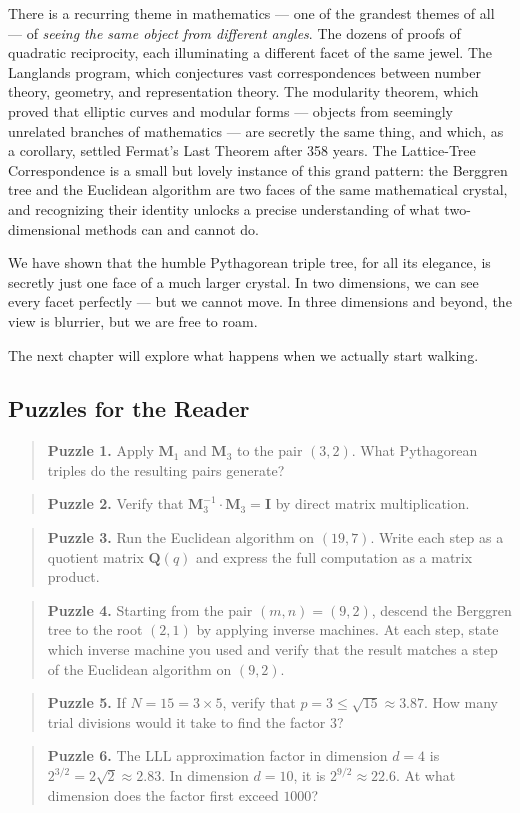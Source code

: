 \documentclass[11pt,twoside,openright]{book}
\theoremstyle{definition}
\theoremstyle{remark}
\begin{document}
There is a recurring theme in mathematics --- one of the grandest themes of all --- of \textit{seeing the same object from different angles}. The dozens of proofs of quadratic reciprocity, each illuminating a different facet of the same jewel. The Langlands program, which conjectures vast correspondences between number theory, geometry, and representation theory. The modularity theorem, which proved that elliptic curves and modular forms --- objects from seemingly unrelated branches of mathematics --- are secretly the same thing, and which, as a corollary, settled Fermat's Last Theorem after 358 years. The Lattice-Tree Correspondence is a small but lovely instance of this grand pattern: the Berggren tree and the Euclidean algorithm are two faces of the same mathematical crystal, and recognizing their identity unlocks a precise understanding of what two-dimensional methods can and cannot do.

We have shown that the humble Pythagorean triple tree, for all its elegance, is secretly just one face of a much larger crystal. In two dimensions, we can see every facet perfectly --- but we cannot move. In three dimensions and beyond, the view is blurrier, but we are free to roam.

The next chapter will explore what happens when we actually start walking.


\subsection{Puzzles for the Reader}

\begin{quote}
\textbf{Puzzle 1.} Apply $\mathbf{M}_1$ and $\mathbf{M}_3$ to the pair $(3, 2)$. What Pythagorean triples do the resulting pairs generate?
\end{quote}
\begin{quote}
\textbf{Puzzle 2.} Verify that $\mathbf{M}_3^{-1} \cdot \mathbf{M}_3 = \mathbf{I}$ by direct matrix multiplication.
\end{quote}
\begin{quote}
\textbf{Puzzle 3.} Run the Euclidean algorithm on $(19, 7)$. Write each step as a quotient matrix $\mathbf{Q}(q)$ and express the full computation as a matrix product.
\end{quote}
\begin{quote}
\textbf{Puzzle 4.} Starting from the pair $(m, n) = (9, 2)$, descend the Berggren tree to the root $(2, 1)$ by applying inverse machines. At each step, state which inverse machine you used and verify that the result matches a step of the Euclidean algorithm on $(9, 2)$.
\end{quote}
\begin{quote}
\textbf{Puzzle 5.} If $N = 15 = 3 \times 5$, verify that $p = 3 \le \sqrt{15} \approx 3.87$. How many trial divisions would it take to find the factor $3$?
\end{quote}
\begin{quote}
\textbf{Puzzle 6.} The LLL approximation factor in dimension $d = 4$ is $2^{3/2} = 2\sqrt{2} \approx 2.83$. In dimension $d = 10$, it is $2^{9/2} \approx 22.6$. At what dimension does the factor first exceed $1000$?
\end{quote}
\end{document}
